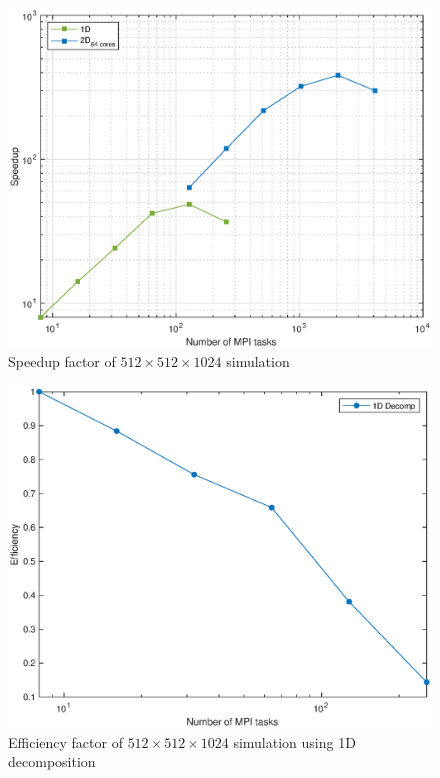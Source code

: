 \begin{figure}
\begin{center}
\includegraphics[scale=0.55]{grafici/5122}
\caption{Speedup factor of $512\times 512\times 1024$ simulation}
\label{5122}
\end{center}
\end{figure}

\begin{figure}
\begin{center}
\includegraphics[scale=0.55]{grafici/5123}
\caption{Efficiency factor of $512\times 512\times 1024$ simulation using 1D decomposition}
\label{5123}
\end{center}
\end{figure}

